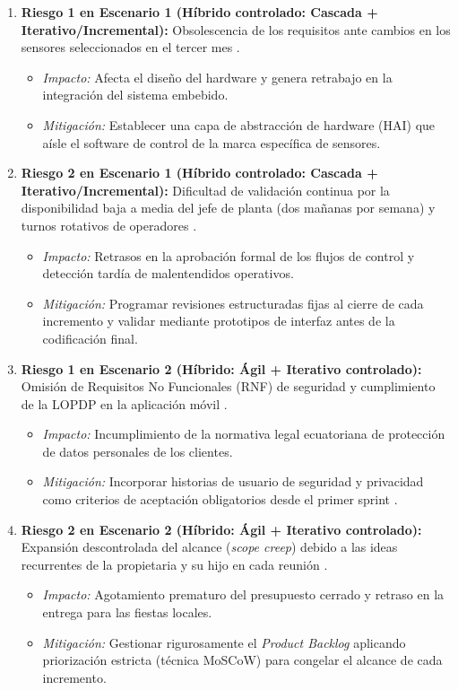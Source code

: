 \documentclass{article}
\begin{document}
\begin{enumerate}
    \item \textbf{Riesgo 1 en Escenario 1 (Híbrido controlado: Cascada + Iterativo/Incremental):} Obsolescencia de los requisitos ante cambios en los sensores seleccionados en el tercer mes \cite{GA_Prac_01}.
        \begin{itemize}
            \item \textit{Impacto:} Afecta el diseño del hardware y genera retrabajo en la integración del sistema embebido.
            \item \textit{Mitigación:} Establecer una capa de abstracción de hardware (HAI) que aísle el software de control de la marca específica de sensores.
        \end{itemize}
    \item \textbf{Riesgo 2 en Escenario 1 (Híbrido controlado: Cascada + Iterativo/Incremental):} Dificultad de validación continua por la disponibilidad baja a media del jefe de planta (dos mañanas por semana) y turnos rotativos de operadores \cite{GA_Prac_01}.
        \begin{itemize}
            \item \textit{Impacto:} Retrasos en la aprobación formal de los flujos de control y detección tardía de malentendidos operativos.
            \item \textit{Mitigación:} Programar revisiones estructuradas fijas al cierre de cada incremento y validar mediante prototipos de interfaz antes de la codificación final.
        \end{itemize}

    \item \textbf{Riesgo 1 en Escenario 2 (Híbrido: Ágil + Iterativo controlado):} Omisión de Requisitos No Funcionales (RNF) de seguridad y cumplimiento de la LOPDP en la aplicación móvil \cite{GA_Prac_01}.
        \begin{itemize}
            \item \textit{Impacto:} Incumplimiento de la normativa legal ecuatoriana de protección de datos personales de los clientes.
            \item \textit{Mitigación:} Incorporar historias de usuario de seguridad y privacidad como criterios de aceptación obligatorios desde el primer sprint \cite{Pohl2025}.
        \end{itemize}
    \item \textbf{Riesgo 2 en Escenario 2 (Híbrido: Ágil + Iterativo controlado):} Expansión descontrolada del alcance (\emph{scope creep}) debido a las ideas recurrentes de la propietaria y su hijo en cada reunión \cite{GA_Prac_01}.
        \begin{itemize}
            \item \textit{Impacto:} Agotamiento prematuro del presupuesto cerrado y retraso en la entrega para las fiestas locales.
            \item \textit{Mitigación:} Gestionar rigurosamente el \emph{Product Backlog} aplicando priorización estricta (técnica MoSCoW) para congelar el alcance de cada incremento.
        \end{itemize}


\end{enumerate}
\end{document}
